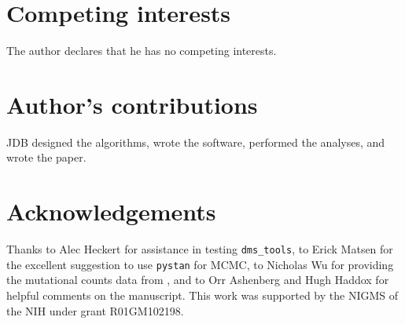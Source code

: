 \documentclass[twocolumn]{bmcart}%
\begin{document}
\begin{backmatter}

\section*{Competing interests}
  The author declares that he has no competing interests.

\section*{Author's contributions}
JDB designed the algorithms, wrote the software, performed the analyses, and wrote the paper.

\section*{Acknowledgements}
Thanks to Alec Heckert for assistance in testing \texttt{dms\_tools}, to Erick Matsen for the excellent suggestion to use \texttt{pystan} for MCMC,  to Nicholas Wu for providing the mutational counts data from \cite{wu2014ns}, and to Orr Ashenberg and Hugh Haddox for helpful comments on the manuscript. This work was supported by the NIGMS of the NIH under grant R01GM102198.




\end{backmatter}
\end{document}
